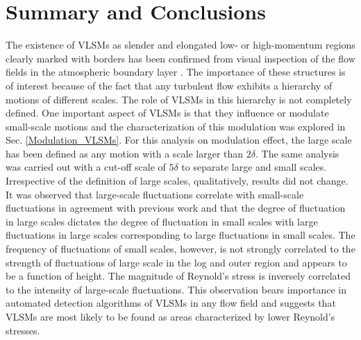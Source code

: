 
\section{Summary and Conclusions}
The existence of VLSMs as slender and elongated low- or high-momentum regions clearly marked with borders has been confirmed from visual inspection of the flow fields in the atmospheric boundary layer \citep{traumner_blm_2015}. The importance of these structures is of interest because of the fact that any turbulent flow exhibits a hierarchy of motions of different scales. The role of VLSMs in this hierarchy is not completely defined. One important aspect of VLSMs is that they influence or modulate small-scale motions and the characterization of this modulation was explored in Sec. \ref{Modulation_VLSMs}. For this analysis on modulation effect, the large scale has been defined as any motion with a scale larger than $2\delta$. The same analysis was carried out with a cut-off scale of $5\delta$ to separate large and small scales. Irrespective of the definition of large scales, qualitatively, results did not change. It was observed that large-scale fluctuations correlate with small-scale fluctuations in agreement with previous work \citep{ganapathi_jfm_2012_modulation} and that the degree of fluctuation in large scales dictates the degree of fluctuation in small scales with large fluctuations in large scales corresponding to large fluctuations in small scales. The frequency of fluctuations of small scales, however, is not strongly correlated to the strength of fluctuations of large scale in the log and outer region and appears to be a function of height. The magnitude of Reynold's stress is inversely correlated to the intensity of large-scale fluctuations. This observation bears importance in automated detection algorithms of VLSMs in any flow field and suggests that VLSMs are most likely to be found as areas characterized by lower Reynold's stresses.  

